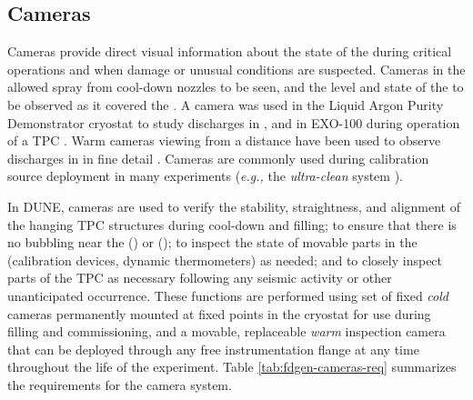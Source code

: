 \subsection{Cameras}
\label{sec:fdgen-slow-cryo-cameras}

Cameras provide direct visual information about the state of the
 during critical operations and when damage or unusual
conditions are suspected.  Cameras in the   \dual allowed spray from cool-down
nozzles to be seen, and the level and state of the \lar to be
observed as it covered the  \cite{Murphy:20170516}.  A camera was
used in the Liquid Argon Purity Demonstrator
cryostat\cite{Adamowski:2014daa} to study  discharges in
\lar, and in EXO-100 during operation of a TPC
\cite{Delaquis:2013hva}.  Warm cameras viewing \lar from a distance
have been used to observe  discharges in \lar in
fine detail \cite{Auger:2015xlo}.  Cameras are commonly used during
calibration source deployment in many experiments ({\em e.g.,} the
\kamland \textit{ultra-clean} system \cite{Banks:2014hra}).

In DUNE, cameras are used to verify the stability, straightness,
and alignment of the hanging TPC structures during cool-down and
filling; to ensure that there is no bubbling near the 
(\single) or  (\dual); to inspect the
state of movable parts in the  (calibration devices, dynamic
thermometers) as needed; and to closely inspect parts of the TPC as
necessary following any seismic activity or other unanticipated
occurrence.  These functions are performed using set of fixed
\textit{cold} cameras permanently mounted at fixed points in the cryostat
for use during filling and commissioning, and a movable, replaceable
\textit{warm} inspection camera that can be deployed through any free
instrumentation flange at any time throughout the life of the
experiment.  Table \ref{tab:fdgen-cameras-req} summarizes the
requirements for the camera system.

